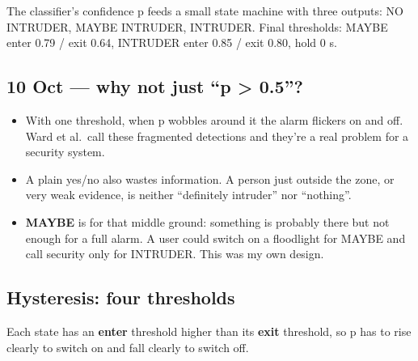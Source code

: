 \documentclass[11pt,a4paper]{article}
\providecommand{\tightlist}{\setlength{\itemsep}{0pt}\setlength{\parskip}{0pt}}
\begin{document}
The classifier's confidence p
feeds a small state machine
with three outputs: NO
INTRUDER, MAYBE INTRUDER,
INTRUDER. Final thresholds:
MAYBE enter 0.79 / exit 0.64,
INTRUDER enter 0.85 / exit
0.80, hold 0 s.

\hypertarget{oct-why-not-just-p-0.5}{%
\subsection{10 Oct --- why not
just ``p \textgreater{}
0.5''?}\label{oct-why-not-just-p-0.5}}

\begin{itemize}
\tightlist
\item
  With one threshold, when p
  wobbles around it the alarm
  flickers on and off. Ward et
  al.~call these fragmented
  detections and they're a
  real problem for a security
  system.
\item
  A plain yes/no also wastes
  information. A person just
  outside the zone, or very
  weak evidence, is neither
  ``definitely intruder'' nor
  ``nothing''.
\item
  \textbf{MAYBE} is for that
  middle ground: something is
  probably there but not
  enough for a full alarm. A
  user could switch on a
  floodlight for MAYBE and
  call security only for
  INTRUDER. This was my own
  design.
\end{itemize}

\hypertarget{hysteresis-four-thresholds}{%
\subsection{Hysteresis: four
thresholds}\label{hysteresis-four-thresholds}}

Each state has an
\textbf{enter} threshold
higher than its \textbf{exit}
threshold, so p has to rise
clearly to switch on and fall
clearly to switch off.
\end{document}
